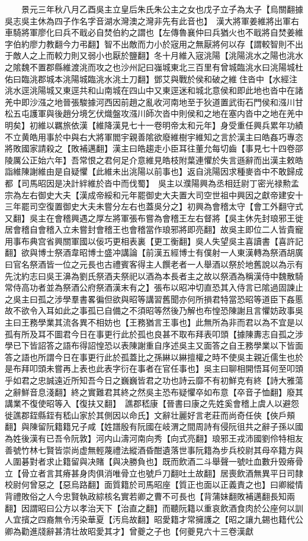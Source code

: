 　　景元三年秋八月乙酉吳主立皇后朱氏朱公主之女也戊子立子為太子【烏關翻據吳志吳主休為四子作名字音湖水灣澳之灣非先有此音也】　漢大將軍姜維將出軍右車騎將軍廖化曰兵不戢必自焚伯約之謂也【左傳魯襄仲曰兵猶火也不戢將自焚姜維字伯約廖力教翻今力弔翻】智不出敵而力小於宼用之無厭將何以存【謂較智則不出于敵人之上而較力則又弱小也厭於鹽翻】冬十月維入宼洮陽【洮陽洮水之陽也洮水之隂魏不置郡縣維渡洮而攻之也沙州記曰嵹城東北三百里有曾城臨洮水曰洮陽城杜佑曰臨洮郡城本洮陽城臨洮水洮土刀翻】鄧艾與戰於侯和破之維住沓中【水經注洮水逕洮陽城又東逕共和山南城在四山中又東逕迷和城北意侯和即此地也沓中在諸羌中即沙漒之地晉張駿據河西因前趙之亂收河南地至于狄道置武街石門侯和漒川甘松五屯護軍與後趙分境乞伏熾盤攻漒川師次沓中則侯和之地在塞内沓中之地在羌中明矣】初維以羈旅依漢【維降漢見七十一卷明帝太和元年】身受重任興兵累年功績不立黄皓用事於中與右大將軍閻宇親善隂欲廢維樹宇維知之言於漢主曰皓姦巧專恣將敗國家請殺之【敗補邁翻】漢主曰皓趨走小臣耳往董允每切齒【事見七十四卷邵陵厲公正始六年】吾常恨之君何足介意維見皓枝附葉連懼於失言遜辭而出漢主敕皓詣維陳謝維由是自疑懼【此維未出洮陽以前事也】返自洮陽因求種麥沓中不敢歸成都【司馬昭因是决計絆維於沓中而伐蜀】　吳主以濮陽興為丞相廷尉丁密光禄勲孟宗為左右御史大夫【漢成帝綏和元年罷御史大夫置大司空世祖中興因之獻帝建安十三年罷司空復置御史大夫未嘗分左右也蓋吳分之】初興為會稽太守【會工外翻守式又翻】吳主在會稽興遇之厚左將軍張布嘗為會稽王左右督將【吳主休先封琅邪王徙居會稽自會稽入立未嘗封會稽王也會稽當作琅邪將即亮翻】故吳主即位二人皆貴寵用事布典宫省興關軍國以佞巧更相表裏【更工衡翻】吳人失望吳主喜讀書【喜許記翻】欲與博士祭酒韋昭博士盛冲講論【前漢五經博士有僕射一人東漢轉為祭酒胡廣曰官名祭酒皆一位之元長也古禮賓客得主人饌老者一人舉酒以祭於地舊說以為示有先沈約志曰吳王濞為劉氏祭酒夫祭祀以酒為本長者主之故以祭酒為稱漢侍中魏散騎常侍高功者並為祭酒公府祭酒漢末有之】張布以昭冲切直恐其入侍言已隂過固諫止之吳主曰孤之涉學羣書畧徧但欲與昭等講習舊聞亦何所損君特當恐昭等道臣下姦慝故不欲令入耳如此之事孤已自備之不須昭等然後乃解也布惶恐陳謝且言懼妨政事吳主曰王務學業其流各異不相妨也【王務猶言王事也】此無所為非而君以為不宜是以孤有所及耳不圖君今日在事更行此於孤也良甚不取布拜表叩頭【據陳夀志自孤之涉學已下皆詔答之語布得詔惶恐以表陳謝重自序述吳主又面答之自王務學業以下皆面答之語也所謂今日在事更行此於孤蓋比之孫綝以綝擅權之時不使吳主親近儒生也於是布拜叩頭未嘗再上表也此表字衍在事者在官任事也】吳主曰聊相開悟耳何至叩頭乎如君之忠誠遠近所知吾今日之巍巍皆君之功也詩云靡不有初鮮克有終【詩大雅蕩之辭鮮音息淺翻】終之實難君其終之然吳主恐布疑懼卒如布意【卒音子恤翻】廢其講業不復使昭等入【復扶又翻】　譙郡嵇康【晉書曰康之先姓奚會稽上虞人以避怨徙譙郡銍縣銍有嵇山家於其側因以命氏】文辭壮麗好言老莊而尚奇任俠【俠戶頰翻】與陳留阮籍籍兄子咸【姓譜殷有阮國在岐渭之間周詩有侵阮徂共之辭子孫以國為姓後漢有已吾令阮敦】河内山濤河南向秀【向式亮翻】琅邪王戎沛國劉伶特相友善號竹林七賢皆崇尚虚無輕蔑禮法縱酒昏酣遺落世事阮籍為步兵校尉其母卒籍方與人圍碁對者求止籍留與决賭【與决勝負也】既而飲酒二斗舉聲一號吐血數升毁瘠骨立【骨立者言其瘠甚身肉俱消唯骨立也號戶刀翻吐土故翻】居喪飲酒無異平日司隸校尉何曾惡之【惡烏路翻】面質籍於司馬昭座【質正也面以正義責之也】曰卿縱情背禮敗俗之人今忠賢執政綜核名實若卿之曹不可長也【背蒲妹翻敗補邁翻長知兩翻】因謂昭曰公方以孝治天下【治直之翻】而聽阮籍以重哀飲酒食肉於公座何以訓人宜擯之四裔無令汚染華夏【汚烏故翻】昭愛籍才常擁護之【昭之讓九錫也籍代公卿為勸進牋辭甚清壮故昭愛其才】曾夔之子也【何夔見六十三卷漢獻